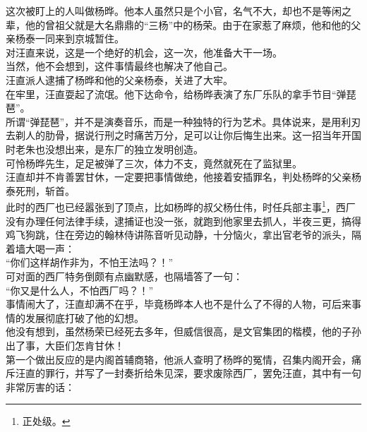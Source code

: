 \begin{multicols}{\theparacolNo}
这次被盯上的人叫做杨晔。他本人虽然只是个小官，名气不大，却也不是等闲之辈，他的曾祖父就是大名鼎鼎的“三杨”中的杨荣。由于在家惹了麻烦，他和他的父亲杨泰一同来到京城暂住。\\

对汪直来说，这是一个绝好的机会，这一次，他准备大干一场。\\

当然，他不会想到，这件事情最终也解决了他自己。\\

汪直派人逮捕了杨晔和他的父亲杨泰，关进了大牢。\\

在牢里，汪直耍起了流氓。他下达命令，给杨晔表演了东厂乐队的拿手节目“弹琵琶”。\\

所谓“弹琵琶”，并不是演奏音乐，而是一种独特的行为艺术。具体说来，是用利刃去剃人的肋骨，据说行刑之时痛苦万分，足可以让你后悔生出来。这一招当年开国时老朱也没想出来，是东厂的独立发明创造。\\

可怜杨晔先生，足足被弹了三次，体力不支，竟然就死在了监狱里。\\

汪直却并不肯善罢甘休，一定要把事情做绝，他接着安插罪名，判处杨晔的父亲杨泰死刑，斩首。\\

此时的西厂也已经嚣张到了顶点，比如杨晔的叔父杨仕伟，时任兵部主事\footnote{正处级。}，西厂没有办理任何法律手续，逮捕证也没一张，就跑到他家里去抓人，半夜三更，搞得鸡飞狗跳，住在旁边的翰林侍讲陈音听见动静，十分恼火，拿出官老爷的派头，隔着墙大喝一声：\\

“你们这样胡作非为，不怕王法吗？！”\\

可对面的西厂特务倒颇有点幽默感，也隔墙答了一句：\\

“你又是什么人，不怕西厂吗？！”\\

事情闹大了，汪直却满不在乎，毕竟杨晔本人也不是什么了不得的人物，可后来事情的发展彻底打破了他的幻想。\\

他没有想到，虽然杨荣已经死去多年，但威信很高，是文官集团的楷模，他的子孙出了事，大臣们怎肯甘休！\\

第一个做出反应的是内阁首辅商辂，他派人查明了杨晔的冤情，召集内阁开会，痛斥汪直的罪行，并写了一封奏折给朱见深，要求废除西厂，罢免汪直，其中有一句非常厉害的话：\\


\end{multicols}
